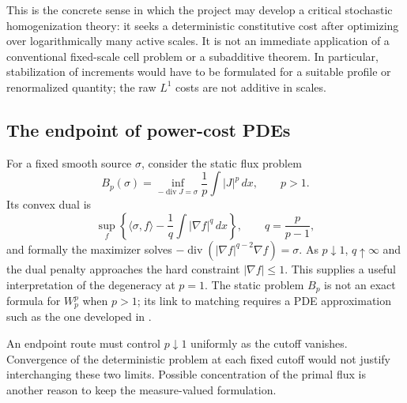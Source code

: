 \documentclass[11pt]{article}
\theoremstyle{definition}
\newcommand{\diver}{\operatorname{div}}
\newcommand{\dd}{\,dx}
\begin{document}
This is the concrete sense in which the project may develop a critical
stochastic homogenization theory: it seeks a deterministic constitutive
cost after optimizing over logarithmically many active scales. It is
not an immediate application of a conventional fixed-scale cell
problem or a subadditive theorem. In particular, stabilization of
increments would have to be formulated for a suitable profile or
renormalized quantity; the raw $L^1$ costs are not additive in scales.

\subsection{The endpoint of power-cost PDEs}
For a fixed smooth source $\sigma$, consider the static flux problem
\[
  B_p(\sigma)=\inf_{-\diver J=\sigma}\frac1p\int|J|^p\dd,
  \qquad p>1.
\]
Its convex dual is
\[
  \sup_f\left\{\langle\sigma,f\rangle
                   -\frac1q\int|\nabla f|^q\dd\right\},
  \qquad q=\frac p{p-1},
\]
and formally the maximizer solves
$-\diver(|\nabla f|^{q-2}\nabla f)=\sigma$. As $p\downarrow1$,
$q\uparrow\infty$ and the dual penalty approaches the hard constraint
$|\nabla f|\leq1$. This supplies a useful interpretation of the
degeneracy at $p=1$. The static problem $B_p$ is not an exact formula
for $W_p^p$ when $p>1$; its link to matching requires a PDE
approximation such as the one developed in \cite{AVT}.

An endpoint route must control $p\downarrow1$ uniformly as the cutoff
vanishes. Convergence of the deterministic problem at each fixed
cutoff would not justify interchanging these two limits. Possible
concentration of the primal flux is another reason to keep the
measure-valued formulation.
\end{document}
